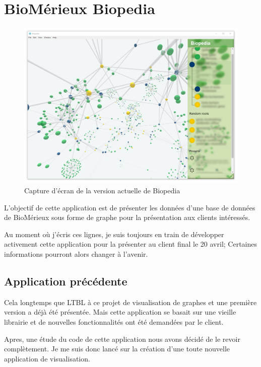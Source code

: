 \section{BioMérieux Biopedia}
\label{biomerieuxBiopedia}

\begin{figure}[h]
    \centering
    \includegraphics[scale=0.35]{img/Biopedia.jpg}
    \caption{Capture d'écran de la version actuelle de Biopedia}
\end{figure}

L'objectif de cette application est de présenter les données d'une base de données de BioMérieux sous forme de graphe pour la présentation aux clients intéressés.

Au moment où j'écris ces lignes, je suis toujours en train de développer activement cette application pour la présenter au client final le 20 avril;
Certaines informations pourront alors changer à l'avenir.

\subsection{Application précédente}
\label{biomerieuxBiopediaApplicationPrécédente}

Cela longtemps que LTBL à ce projet de visualisation de graphes et une première version a déjà été présentée.
Mais cette application se basait sur une vieille librairie et de nouvelles fonctionnalités ont été demandées par le client.

Apres, une étude du code de cette application nous avons décidé de le revoir complètement.
Je me suis donc lancé sur la création d'une toute nouvelle application de visualisation.

